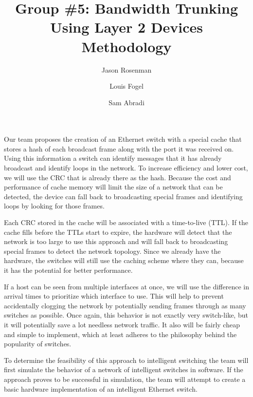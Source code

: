 \documentclass{article}
\title{Group \#5: Bandwidth Trunking Using Layer 2 Devices\\Methodology}
\author{Jason Rosenman \and Louis Fogel \and Sam Abradi}
\date{}
\begin{document}
\maketitle

	Our team proposes the creation of an Ethernet switch with a special cache that stores a hash of each broadcast frame along with the port it was received on.
	Using this information a switch can identify messages that it has already broadcast and identify loops in the network.
	To increase efficiency and lower cost, we will use the CRC that is already there as the hash.
	Because the cost and performance of cache memory will limit the size of a network that can be detected, the device can fall back to broadcasting special frames and identifying loops by looking for those frames.

	Each CRC stored in the cache will be associated with a time-to-live (TTL).
	If the cache fills before the TTLs start to expire, the hardware will detect that the network is too large to use this approach and will fall back to broadcasting special frames to detect the network topology.
        Since we already have the hardware, the switches will still use the caching scheme where they can, because it has the potential for better performance.

	If a host can be seen from multiple interfaces at once, we will use the difference in arrival times to prioritize which interface to use. 
	This will help to prevent accidentally clogging the network by potentially sending frames through as many switches as possible. Once again, this behavior is not exactly very switch-like, but it will potentially save a lot needless network traffic. 
	It also will be fairly cheap and simple to implement, which at least adheres to the philosophy behind the popularity of switches.

	To determine the feasibility of this approach to intelligent switching the team will first simulate the behavior of a network of intelligent switches in software.
	If the approach proves to be successful in simulation, the team will attempt to create a basic hardware implementation of an intelligent Ethernet switch.
	
\end{document}
